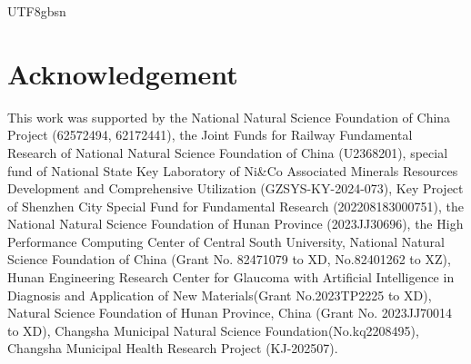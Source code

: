 \documentclass[times, review, 10pt]{elsarticle}
\begin{document}
\begin{CJK}{UTF8}{gbsn}
\section*{Acknowledgement}
This work was supported by the National Natural Science Foundation of China Project (62572494, 62172441), the Joint Funds for Railway Fundamental Research of National Natural Science Foundation of China (U2368201), special fund of National State Key Laboratory of Ni\&Co Associated Minerals Resources Development and Comprehensive Utilization (GZSYS-KY-2024-073), Key Project of Shenzhen City Special Fund for Fundamental Research (202208183000751), the National Natural Science Foundation of Hunan Province (2023JJ30696), the High Performance Computing Center of Central South University, National Natural Science Foundation of China (Grant No. 82471079 to XD, No.82401262 to XZ), Hunan Engineering Research Center for Glaucoma with Artificial Intelligence in Diagnosis and Application of New Materials(Grant No.2023TP2225 to XD), Natural Science Foundation of Hunan Province, China (Grant No. 2023JJ70014 to XD), Changsha Municipal Natural Science Foundation(No.kq2208495), Changsha Municipal Health Research Project (KJ-202507).







\end{CJK}
\end{document}
